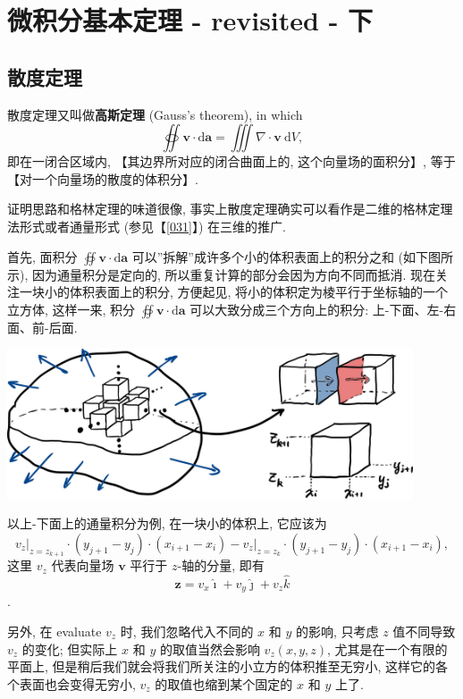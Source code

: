 \section{微积分基本定理 - revisited - 下}\label{032}

\subsection{散度定理}

散度定理又叫做\textbf{高斯定理} (Gauss's theorem), in which \[
\boxed{\oiint\boldsymbol{v}\cdot\mathrm{d}\boldsymbol{a}=\iiint\nabla\cdot\boldsymbol{v}\ \mathrm{d}V},
\] 即在一闭合区域内, 【其边界所对应的闭合曲面上的, 这个向量场的面积分】,
等于【对一个向量场的散度的体积分】.

证明思路和格林定理的味道很像,
事实上散度定理确实可以看作是二维的格林定理法形式或者通量形式
(参见【\ref{031}】) 在三维的推广.

首先, 面积分 $\oiint\boldsymbol{v}\cdot\mathrm{d}\boldsymbol{a}$
可以''拆解''成许多个小的体积表面上的积分之和 (如下图所示),
因为通量积分是定向的, 所以重复计算的部分会因为方向不同而抵消.
现在关注一块小的体积表面上的积分, 方便起见,
将小的体积定为棱平行于坐标轴的一个立方体, 这样一来, 积分
$\oiint\boldsymbol{v}\cdot\mathrm{d}\boldsymbol{a}$
可以大致分成三个方向上的积分: 上-下面、左-右面、前-后面.

\begin{tcolorbox}[size=fbox, breakable, enhanced jigsaw]
    \includegraphics[width=0.9\textwidth]{./img/image-20240618231420999.png}
\end{tcolorbox}

以上-下面上的通量积分为例, 在一块小的体积上, 它应该为 \[
v_z\big|_{z=z_{k+1}}\cdot(y_{j+1}-y_{j})\cdot(x_{i+1}-x_i)-v_z\big|_{z=z_{k}}\cdot(y_{j+1}-y_{j})\cdot(x_{i+1}-x_i),
\] 这里 $v_z$ 代表向量场 $\boldsymbol{v}$ 平行于 $z$-轴的分量,
即有 \[\boldsymbol{z}=v_x\hat{\imath}+v_y\hat{\jmath}+v_z\hat{k}\].

\begin{newquote}
另外, 在 evaluate $v_z$ 时, 我们忽略代入不同的 $x$ 和 $y$ 的影响,
只考虑 $z$ 值不同导致 $v_z$ 的变化; 但实际上 $x$ 和 $y$
的取值当然会影响 $v_z(x,y,z)$, 尤其是在一个有限的平面上,
但是稍后我们就会将我们所关注的小立方的体积推至无穷小,
这样它的各个表面也会变得无穷小, $v_z$ 的取值也缩到某个固定的 $x$ 和
$y$ 上了.
\end{newquote}

